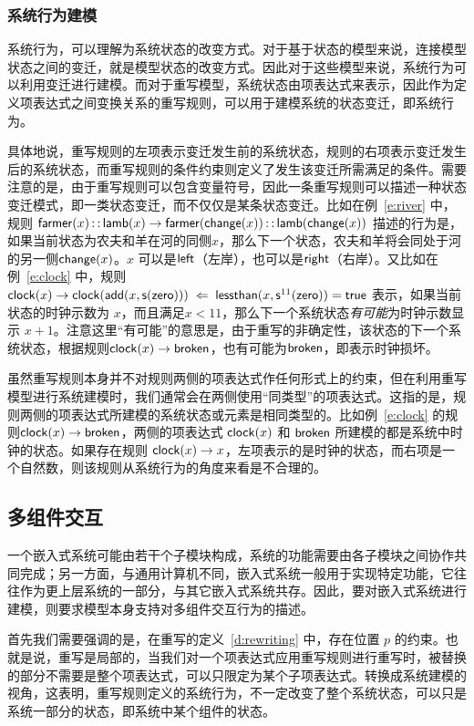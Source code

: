 \subsubsection{系统行为建模}

系统行为，可以理解为系统状态的改变方式。对于基于状态的模型来说，连接模型状态之间的变迁，就是模型状态的改变方式。因此对于这些模型来说，系统行为可以利用变迁进行建模。而对于重写模型，系统状态由项表达式来表示，因此作为定义项表达式之间变换关系的重写规则，可以用于建模系统的状态变迁，即系统行为。

具体地说，重写规则的左项表示变迁发生前的系统状态，规则的右项表示变迁发生后的系统状态，而重写规则的条件约束则定义了发生该变迁所需满足的条件。需要注意的是，由于重写规则可以包含变量符号，因此一条重写规则可以描述一种状态变迁模式，即一类状态变迁，而不仅仅是某条状态变迁。比如在例~\ref{e:river} 中，规则 $\operatorname{\mathsf{farmer}}(x)\operatorname{\mathsf{::}} \operatorname{\mathsf{lamb}}(x) \rightarrow \operatorname{\mathsf{farmer}}(\operatorname{\mathsf{change}}(x))\operatorname{\mathsf{::}}\operatorname{\mathsf{lamb}}(\operatorname{\mathsf{change}}(x))$ 描述的行为是，如果当前状态为农夫和羊在河的同侧$x$，那么下一个状态，农夫和羊将会同处于河的另一侧$\operatorname{\mathsf{change}}(x)$。$x$ 可以是$\operatorname{\mathsf{left}}$（左岸），也可以是$\operatorname{\mathsf{right}}$（右岸）。又比如在例~\ref{e:clock} 中，规则 $\operatorname{\mathsf{clock}}(x) \rightarrow \operatorname{\mathsf{clock}}(\operatorname{\mathsf{add}}(x,\operatorname{\mathsf{s}}(\operatorname{\mathsf{zero}}))) \;\Leftarrow\; \operatorname{\mathsf{lessthan}}(x,\operatorname{\mathsf{s}}^{11}(\operatorname{\mathsf{zero}})) = \operatorname{\mathsf{true}}$ 表示，如果当前状态的时钟示数为 $x$，而且满足$x < 11$，那么下一个系统状态\emph{有可能}为时钟示数显示 $x+1$。注意这里“有可能”的意思是，由于重写的非确定性，该状态的下一个系统状态，根据规则$\operatorname{\mathsf{clock}}(x) \rightarrow \operatorname{\mathsf{broken}}$，也有可能为$\operatorname{\mathsf{broken}}$，即表示时钟损坏。

虽然重写规则本身并不对规则两侧的项表达式作任何形式上的约束，但在利用重写模型进行系统建模时，我们通常会在两侧使用“同类型”的项表达式。这指的是，规则两侧的项表达式所建模的系统状态或元素是相同类型的。比如例~\ref{e:clock} 的规则$\operatorname{\mathsf{clock}}(x) \rightarrow \operatorname{\mathsf{broken}}$，两侧的项表达式 $\operatorname{\mathsf{clock}}(x)$ 和 $\operatorname{\mathsf{broken}}$ 所建模的都是系统中时钟的状态。如果存在规则 $\operatorname{\mathsf{clock}}(x) \rightarrow x$，左项表示的是时钟的状态，而右项是一个自然数，则该规则从系统行为的角度来看是不合理的。

\subsection{多组件交互}
\label{ss:multi-component}

一个嵌入式系统可能由若干个子模块构成，系统的功能需要由各子模块之间协作共同完成；另一方面，与通用计算机不同，嵌入式系统一般用于实现特定功能，它往往作为更上层系统的一部分，与其它嵌入式系统共存。因此，要对嵌入式系统进行建模，则要求模型本身支持对多组件交互行为的描述。

首先我们需要强调的是，在重写的定义~\ref{d:rewriting} 中，存在位置 $p$ 的约束。也就是说，重写是局部的，当我们对一个项表达式应用重写规则进行重写时，被替换的部分不需要是整个项表达式，可以只限定为某个子项表达式。转换成系统建模的视角，这表明，重写规则定义的系统行为，不一定改变了整个系统状态，可以只是系统一部分的状态，即系统中某个组件的状态。

